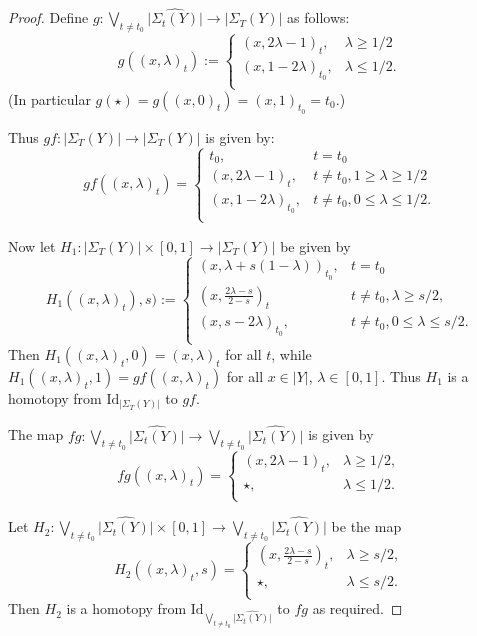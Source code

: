 \documentclass[12pt]{amsart}
\theoremstyle{definition}
\newcommand{\<}{\langle}
\renewcommand{\>}{\rangle}
\newcommand{\id}[1]{\mathrm{Id}_{#1}}
\newcommand{\mc}[2]{\Sigma_{#1}(#2)}
\newcommand{\pmc}[2]{\widehat{|\mc{#1}{#2}|}}
\begin{document}
\begin{proof} Define $g:\bigvee_{t\not=t_0}\pmc{t}{Y}\to |\mc{T}{Y}|$ as follows: 
\[
g((x,\lambda)_t):=
\left\{
\begin{array}{ll}
(x,2\lambda-1)_t,&\lambda\geq 1/2\\
(x,1-2\lambda)_{t_0}, &\lambda\leq 1/2.\\
\end{array}
\right.
\]
(In particular $g(\star)=g((x,0)_t)=(x,1)_{t_0}=t_0$.)

Thus $gf:|\mc{T}{Y}|\to|\mc{T}{Y}|$ is given by:
\[
gf((x,\lambda)_t)=
\left\{
\begin{array}{ll}
t_0,& t=t_0\\
( x,2\lambda-1)_t,& t\not= t_0, 1\geq \lambda\geq 1/2\\
(x,1-2\lambda)_{t_0},& t\not=t_0,0\leq \lambda\leq 1/2.\\
\end{array}
\right.
\]

Now let  $H_1:|\mc{T}{Y}|\times [0,1]\to |\mc{T}{Y}|$ be given by
\[
H_1((x,\lambda)_t),s):=
\left\{
\begin{array}{ll}
(x,\lambda+s(1-\lambda))_{t_0},&t=t_0\\
\left( x,\frac{2\lambda-s}{2-s}\right)_t&t\not= t_0, \lambda\geq s/2,\\
\left(x,s-2\lambda\right)_{t_0},& t\not= t_0,0\leq  \lambda\leq s/2.\\
\end{array}
\right.
\]
Then $H_1((x,\lambda)_t,0)=(x,\lambda)_t$ for all $t$, while $H_1((x,\lambda)_t,1)=gf((x,\lambda)_t)$  for all $x\in |Y|$, $\lambda\in [0,1]$. Thus $H_1$ is a homotopy from 
$\id{|\mc{T}{Y}|}$ to $gf$.

The map $fg: \bigvee_{t\not=t_0}\pmc{t}{Y}\to \bigvee_{t\not=t_0}\pmc{t}{Y}$ is given by
\[
fg((x,\lambda)_t)=
\left\{
\begin{array}{ll}
(x,2\lambda-1)_t,& \lambda\geq 1/2,\\
\star,& \lambda\leq 1/2.\\
\end{array}
\right.
\]

Let $H_2:\bigvee_{t\not=t_0}\pmc{t}{Y}\times [0,1]\to \bigvee_{t\not=t_0}\pmc{t}{Y}$ be the map
\[
H_2((x,\lambda)_t,s)=
\left\{
\begin{array}{ll}
\left( x,\frac{2\lambda-s}{2-s}\right)_t,&\lambda\geq s/2,\\
\star,&\lambda\leq s/2.\\
\end{array}
\right.
\]
Then $H_2$ is a homotopy from $\id{\bigvee_{t\not=t_0}\pmc{t}{Y}}$ to $fg$ as required.
\end{proof}
\end{document}
